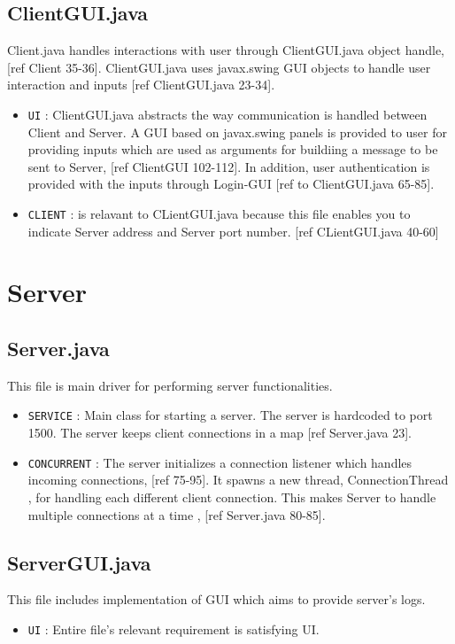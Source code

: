 \documentclass[12pt]{usenixsubmit}
\begin{document}
\subsection{ClientGUI.java} Client.java handles interactions with user through ClientGUI.java object handle, [ref Client 35-36]. ClientGUI.java uses \textsf{javax.swing} GUI objects to handle user interaction and inputs [ref ClientGUI.java 23-34].
\begin{itemize}
\item {\tt UI} : ClientGUI.java abstracts the way communication is handled between Client and Server. A GUI based on \textsf{javax.swing} panels is provided to user for providing inputs which are used as arguments for buildiing a message to be sent to Server, [ref ClientGUI 102-112]. In addition, user authentication is provided with the inputs through Login-GUI [ref to ClientGUI.java 65-85]. 
 \item {\tt CLIENT} : is relavant to CLientGUI.java because this file enables you to indicate Server address and Server port number. [ref CLientGUI.java 40-60]
\end{itemize}

\section{Server}
\subsection{Server.java}This file is main driver for performing server functionalities.
\begin{itemize}
\item {\tt SERVICE} : Main class for starting a server. The server is hardcoded to port 1500. The server keeps client connections in a map [ref Server.java 23].
\item {\tt CONCURRENT} : The server initializes a connection listener which handles incoming connections, [ref 75-95]. It spawns a new thread, ConnectionThread , for handling each different client connection. This makes Server to handle multiple connections at a time , [ref Server.java 80-85].
\end{itemize}

\subsection{ServerGUI.java}This file includes implementation of GUI which aims to provide server's logs.
\begin{itemize}
\item {\tt UI} : Entire file's relevant requirement is satisfying UI.  
\end{itemize}
\end{document}

